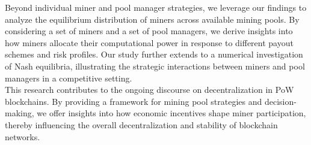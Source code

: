 \noindent Beyond individual miner and pool manager strategies, we leverage our findings to analyze the equilibrium distribution of miners across available mining pools. By considering a set of miners and a set of pool managers, we derive insights into how miners allocate their computational power in response to different payout schemes and risk profiles. Our study further extends to a numerical investigation of Nash equilibria, illustrating the strategic interactions between miners and pool managers in a competitive setting.\\


\noindent This research contributes to the ongoing discourse on decentralization in PoW blockchains. By providing a framework for mining pool strategies and decision-making, we offer insights into how economic incentives shape miner participation, thereby influencing the overall decentralization and stability of blockchain networks.
